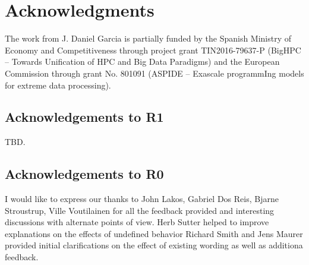 \section*{Acknowledgments}

The work from J. Daniel Garcia is partially funded by
the Spanish Ministry of Economy and Competitiveness through project grant
TIN2016-79637-P (BigHPC -- Towards Unification of HPC and Big Data Paradigms)
and the European Commission through grant
No. 801091 (ASPIDE -- Exascale programmIng models for extreme data processing).

\subsection{Acknowledgements to R1}

{\color{red}TBD.}

\subsection{Acknowledgements to R0}

I would like to express our thanks to John Lakos, Gabriel Dos Reis, Bjarne
Stroustrup, Ville Voutilainen for all the feedback provided and interesting
discussions with alternate points of view.
Herb Sutter helped to improve explanations on the effects of undefined behavior
Richard Smith and Jens Maurer provided initial clarifications on the effect of
existing wording as well as additiona feedback.

